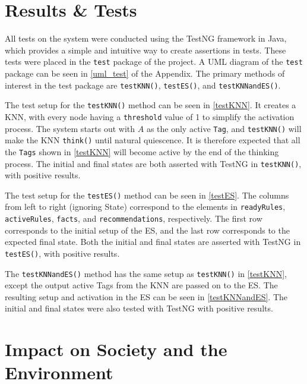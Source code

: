 \documentclass[titlepage,11pt]{article}
\newcommand{\code}[1]{\texttt{#1}}
\begin{document}
\section{Results \& Tests} \label{sec:results}
All tests on the system were conducted using the TestNG framework in Java, which provides a simple and intuitive way to create assertions in tests. These tests were placed in the \code{test} package of the project. A UML diagram of the \code{test} package can be seen in \autoref{uml_test} of the Appendix. The primary methods of interest in the test package are \code{testKNN()}, \code{testES()}, and \code{testKNNandES()}.

The test setup for the \code{testKNN()} method can be seen in \autoref{testKNN}. It creates a KNN, with every node having a \code{threshold} value of 1 to simplify the activation process. The system starts out with $A$ as the only active \code{Tag}, and \code{testKNN()} will make the KNN \code{think()} until natural quiescence. It is therefore expected that all the \code{Tags} shown in \autoref{testKNN} will become active by the end of the thinking process. The initial and final states are both asserted with TestNG in \code{testKNN()}, with positive results.

The test setup for the \code{testES()} method can be seen in \autoref{testES}. The columns from left to right (ignoring State) correspond to the elements in \code{readyRules}, \code{activeRules}, \code{facts}, and \code{recommendations}, respectively. The first row corresponds to the initial setup of the ES, and the last row corresponds to the expected final state. Both the initial and final states are asserted with TestNG in \code{testES()}, with positive results.

The \code{testKNNandES()} method has the same setup as \code{testKNN()} in \autoref{testKNN}, except the output active Tags from the KNN are passed on to the ES. The resulting setup and activation in the ES can be seen in \autoref{testKNNandES}. The initial and final states were also tested with TestNG with positive results.

\section{Impact on Society and the Environment}
\label{sec:impact}
\end{document}
